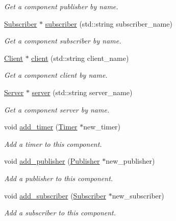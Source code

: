 \begin{DoxyCompactItemize}
\begin{DoxyCompactList}\small\item\em Get a component publisher by name. \end{DoxyCompactList}\item 
\hyperlink{classzcm_1_1Subscriber}{Subscriber} $\ast$ \hyperlink{classzcm_1_1Component_a1a7a463512fbac9e88d04d62ff5fc244}{subscriber} (std\-::string subscriber\-\_\-name)
\begin{DoxyCompactList}\small\item\em Get a component subscriber by name. \end{DoxyCompactList}\item 
\hyperlink{classzcm_1_1Client}{Client} $\ast$ \hyperlink{classzcm_1_1Component_af3be7d967a1fb16cf98adfe0b5b9e4ac}{client} (std\-::string client\-\_\-name)
\begin{DoxyCompactList}\small\item\em Get a component client by name. \end{DoxyCompactList}\item 
\hyperlink{classzcm_1_1Server}{Server} $\ast$ \hyperlink{classzcm_1_1Component_ae4501077c33b5f86e384e15f2b6bbc50}{server} (std\-::string server\-\_\-name)
\begin{DoxyCompactList}\small\item\em Get a component server by name. \end{DoxyCompactList}\item 
void \hyperlink{classzcm_1_1Component_ac9b656236674930c58f7dbfebb063da9}{add\-\_\-timer} (\hyperlink{classzcm_1_1Timer}{Timer} $\ast$new\-\_\-timer)
\begin{DoxyCompactList}\small\item\em Add a timer to this component. \end{DoxyCompactList}\item 
void \hyperlink{classzcm_1_1Component_a3d70420843fc7e0ff2d3d2edc422e992}{add\-\_\-publisher} (\hyperlink{classzcm_1_1Publisher}{Publisher} $\ast$new\-\_\-publisher)
\begin{DoxyCompactList}\small\item\em Add a publisher to this component. \end{DoxyCompactList}\item 
void \hyperlink{classzcm_1_1Component_ac07614093c36e61704d166f00f14c22e}{add\-\_\-subscriber} (\hyperlink{classzcm_1_1Subscriber}{Subscriber} $\ast$new\-\_\-subscriber)
\begin{DoxyCompactList}\small\item\em Add a subscriber to this component. \end{DoxyCompactList}\item 

\end{DoxyCompactItemize}
